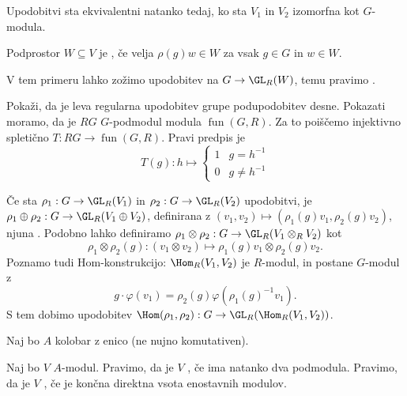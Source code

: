 \begin{opomba}
  Upodobitvi sta ekvivalentni natanko tedaj, ko sta $V_1$ in $V_2$ izomorfna kot
  $G$-modula.
\end{opomba}


\begin{definicija}
  Podprostor $W \subseteq V$ je , če velja $\rho(g) w \in
  W$ za vsak $g \in G$ in $w \in W$.
\end{definicija}

V tem primeru lahko zožimo upodobitev na $G \to \GL_R(W)$, temu pravimo
.

\begin{vo}{Pokaži, da je leva regularna upodobitev grupe podupodobitev desne.}
  Pokazati moramo, da je $RG$ $G$-podmodul modula $\operatorname{fun}(G,R)$.
  Za to poiščemo injektivno spletično $T: RG \to \operatorname{fun}(G,R)$.
  Pravi predpis je
  \[
	T(g) : h \mapsto
	\begin{cases}
	  1 & g = h^{-1} \\
	  0 & g \ne h^{-1}
	\end{cases}
  \]
\end{vo}

Če sta $\rho_1: G \to \GL_R(V_1)$ in $\rho_2: G \to \GL_R(V_2)$ upodobitvi, je
$\rho_1 \oplus \rho_2: G \to \GL_R(V_1 \oplus V_2)$, definirana z $(v_1, v_2)
\mapsto (\rho_1(g) v_1, \rho_2(g) v_2)$, njuna .
Podobno lahko definiramo  $\rho_1 \otimes \rho_2: G \to
\GL_R(V_1 \otimes_R V_2)$ kot
\[
  \rho_1 \otimes \rho_2(g) : (v_1 \otimes v_2) \mapsto \rho_1(g) v_1 \otimes
  \rho_2(g) v_2.
\]
Poznamo tudi Hom-konstrukcijo:
$\Hom_R(V_1, V_2)$ je $R$-modul, in postane $G$-modul z
\[
  g \cdot \varphi(v_1) = \rho_2(g) \varphi(\rho_1(g)^{-1} v_1).
\]
S tem dobimo upodobitev $\Hom(\rho_1, \rho_2): G \to \GL_R(\Hom_R(V_1, V_2))$.



Naj bo $A$ kolobar z enico (ne nujno komutativen).

\begin{definicija}
  Naj bo $V$ $A$-modul.
  Pravimo, da je $V$ , če ima natanko dva podmodula.
  Pravimo, da je $V$ , če je končna direktna vsota
  enostavnih modulov.
\end{definicija}

